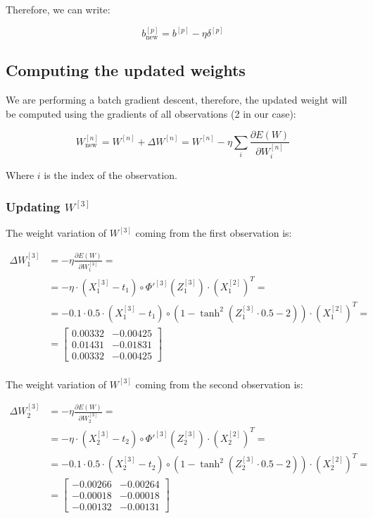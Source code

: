 \documentclass{article}
\begin{document}
Therefore, we can write:

\[ b^{[p]}_{\text{new}} = b^{[p]} - \eta\delta^{[p]} \]

\subsection*{Computing the updated weights}

We are performing a batch gradient descent, therefore, the updated weight will be computed using the gradients of all observations (2 in our case):

\[ W^{[n]}_{\text{new}} = W^{[n]} +\Delta W^{[n]} = W^{[n]} - \eta \sum_i \frac{\partial E(W)}{\partial W^{[n]}_i} \]

Where $i$ is the index of the observation.

\subsubsection*{Updating $W^{[3]}$}

The weight variation of $W^{[3]}$ coming from the first observation is:

\begin{align*}
    \Delta W^{[3]}_1 &= - \eta \frac{\partial E(W)}{\partial W^{[3]}_1} = \\
    &= - \eta \cdot (X^{[3]}_1 - t_1) \circ \Phi'^{[3]}(Z^{[3]}_1)\cdot (X^{[2]}_1)^T =\\
    &= - 0.1 \cdot 0.5 \cdot (X^{[3]}_1 - t_1)  \circ \left( 1 - \tanh^2(Z^{[3]}_1 \cdot 0.5 - 2) \right) \cdot (X^{[2]}_1)^T = \\
    &= \begin{bmatrix}  0.00332 & -0.00425 \\   0.01431 & -0.01831 \\   0.00332 & -0.00425  \end{bmatrix} \\
\end{align*}

The weight variation of $W^{[3]}$ coming from the second observation is:

\begin{align*}
    \Delta W^{[3]}_2 &= - \eta \frac{\partial E(W)}{\partial W^{[3]}_2} = \\
    &= - \eta \cdot (X^{[3]}_2 - t_2) \circ \Phi'^{[3]}(Z^{[3]}_2)\cdot (X^{[2]}_2)^T =\\
    &= - 0.1 \cdot 0.5 \cdot (X^{[3]}_2 - t_2)  \circ \left( 1 - \tanh^2(Z^{[3]}_2 \cdot 0.5 - 2) \right) \cdot (X^{[2]}_2)^T = \\
    &= \begin{bmatrix} -0.00266 & -0.00264 \\  -0.00018 & -0.00018 \\  -0.00132 & -0.00131  \end{bmatrix} \\
\end{align*}
\end{document}
